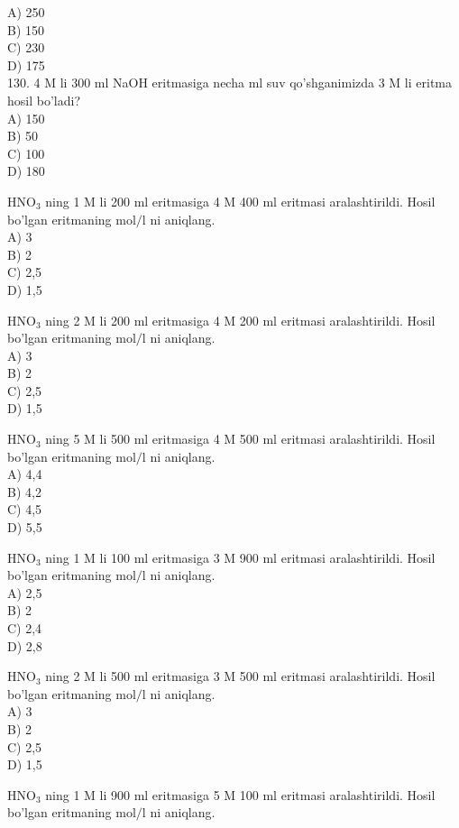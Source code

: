 A) 250\\
B) 150\\
C) 230\\
D) 175\\
130. 4 M li 300 ml NaOH eritmasiga necha ml suv qo'shganimizda 3 M li eritma hosil bo'ladi?\\
A) 150\\
B) 50\\
C) 100\\
D) 180
  \item $\mathrm{HNO}_{3}$ ning 1 M li 200 ml eritmasiga 4 M 400 ml eritmasi aralashtirildi. Hosil bo'lgan eritmaning $\mathrm{mol} / \mathrm{l}$ ni aniqlang.\\
A) 3\\
B) 2\\
C) 2,5\\
D) 1,5
  \item $\mathrm{HNO}_{3}$ ning 2 M li 200 ml eritmasiga 4 M 200 ml eritmasi aralashtirildi. Hosil bo'lgan eritmaning $\mathrm{mol} / \mathrm{l}$ ni aniqlang.\\
A) 3\\
B) 2\\
C) 2,5\\
D) 1,5
  \item $\mathrm{HNO}_{3}$ ning 5 M li 500 ml eritmasiga 4 M 500 ml eritmasi aralashtirildi. Hosil bo'lgan eritmaning $\mathrm{mol} / \mathrm{l}$ ni aniqlang.\\
A) 4,4\\
B) 4,2\\
C) 4,5\\
D) 5,5
  \item $\mathrm{HNO}_{3}$ ning 1 M li 100 ml eritmasiga 3 M 900 ml eritmasi aralashtirildi. Hosil bo'lgan eritmaning $\mathrm{mol} / \mathrm{l}$ ni aniqlang.\\
A) 2,5\\
B) 2\\
C) 2,4\\
D) 2,8
  \item $\mathrm{HNO}_{3}$ ning 2 M li 500 ml eritmasiga 3 M 500 ml eritmasi aralashtirildi. Hosil bo'lgan eritmaning $\mathrm{mol} / \mathrm{l}$ ni aniqlang.\\
A) 3\\
B) 2\\
C) 2,5\\
D) 1,5
  \item $\mathrm{HNO}_{3}$ ning 1 M li 900 ml eritmasiga 5 M 100 ml eritmasi aralashtirildi. Hosil bo'lgan eritmaning $\mathrm{mol} / \mathrm{l}$ ni aniqlang.\\
